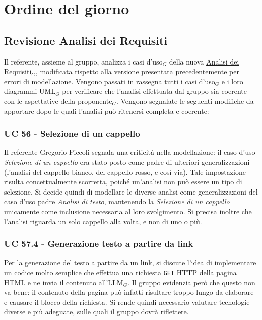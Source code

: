\documentclass[a4paper, 10pt, colorlinks=true, linkcolor=black, urlcolor=blue, citecolor=blue, hidelinks]{article}
\begin{document}
\section{Ordine del giorno}

\subsection{Revisione Analisi dei Requisiti}
Il referente, assieme al gruppo, analizza i casi d'uso$_G$ della nuova \href{https://thebitless.live/RTB/doc_esterna/analisi-dei-requisiti/analisi-dei-requisiti.pdf}{\underline{Analisi dei Requisiti$_G$}}, modificata rispetto alla versione presentata precedentemente per errori di modellazione. Vengono passati in rassegna tutti i casi d'uso$_G$ e i loro diagrammi UML$_G$ per verificare che l'analisi effettuata dal gruppo sia coerente con le aspettative della proponente$_G$. Vengono segnalate le seguenti modifiche da apportare dopo le quali l'analisi può ritenersi completa e coerente:

\subsubsection{UC 56 - Selezione di un cappello}
Il referente Gregorio Piccoli segnala una criticità nella modellazione: il caso d'uso \textit{Selezione di un cappello} era stato posto come padre di ulteriori generalizzazioni (l'analisi del cappello bianco, del cappello rosso, e così via). Tale impostazione risulta concettualmente scorretta, poiché un'analisi non può essere un tipo di selezione. Si decide quindi di modellare le diverse analisi come generalizzazioni del caso d'uso padre \textit{Analisi di testo}, mantenendo la \textit{Selezione di un cappello} unicamente come inclusione necessaria al loro svolgimento. Si precisa inoltre che l'analisi riguarda un solo cappello alla volta, e non di uno o più.

\subsubsection{UC 57.4 - Generazione testo a partire da link}
Per la generazione del testo a partire da un link, si discute l'idea di implementare un codice molto semplice che effettua una richiesta \texttt{GET} HTTP della pagina HTML e ne invia il contenuto all'LLM$_G$. Il gruppo evidenzia però che questo non va bene: il contenuto della pagina può infatti risultare troppo lungo da elaborare e causare il blocco della richiesta. Si rende quindi necessario valutare tecnologie diverse e più adeguate, sulle quali il gruppo dovrà riflettere.
\end{document}
